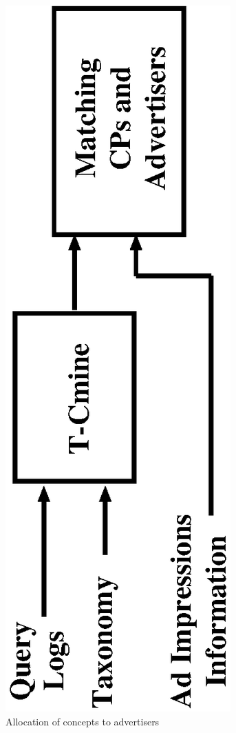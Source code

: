 \begin{figure}
  \centering
\includegraphics[scale=0.38,angle = 270]{visuals/allocationDasfaa.eps}
  \caption{Allocation of concepts to advertisers}
  \label{allocationDasfaa}
\end{figure}


